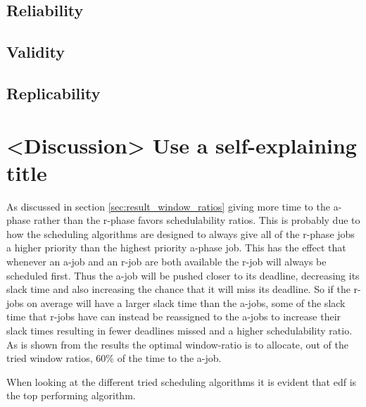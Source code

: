 \documentclass{kththesis}
\begin{document}
\section{Reliability}

\section{Validity}

\section{Replicability}


\chapter{<Discussion> Use a self-explaining title}

As discussed in section \ref{sec:result_window_ratios} giving more time to the \acrshort{a}-phase
rather than the \acrshort{r}-phase favors schedulability ratios. This is probably due to how the
scheduling algorithms are designed to always give all of the \acrshort{r}-phase jobs a higher
priority than the highest priority \acrshort{a}-phase job. This has the effect that whenever an
\acrshort{a}-job and an \acrshort{r}-job are both available the \acrshort{r}-job will always be
scheduled first. Thus the \acrshort{a}-job will be pushed closer to its deadline, decreasing its
slack time and also increasing the chance that it will miss its deadline. So if the
\acrshort{r}-jobs on average will have a larger slack time than the \acrshort{a}-jobs, some of the
slack time that \acrshort{r}-jobs have can instead be reassigned to the \acrshort{a}-jobs to
increase their slack times resulting in fewer deadlines missed and a higher schedulability ratio. As
is shown from the results the optimal window-ratio is to allocate, out of the tried window ratios,
60\% of the time to the \acrshort{a}-job.



When looking at the different tried scheduling algorithms it is evident that \acrshort{edf} is the
top performing algorithm.  
\end{document}
